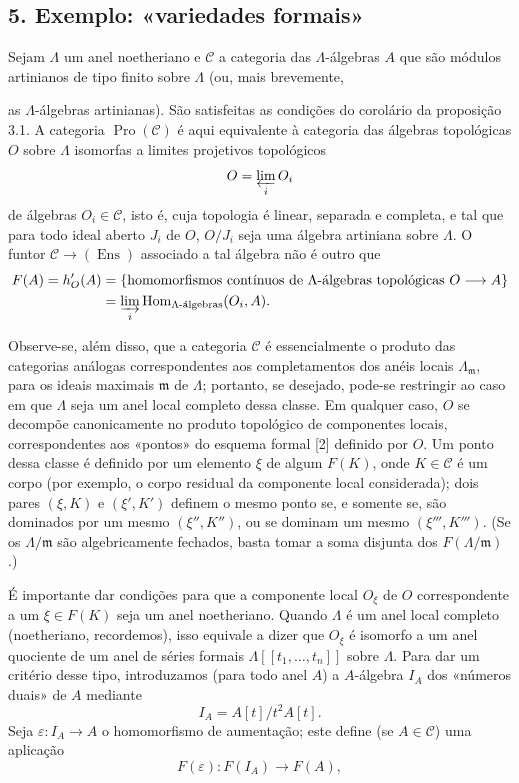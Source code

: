 \documentclass[11pt,twoside,openany]{book}
\numberwithin{equation}{section}
\newcommand{\src}[1]{%
  \phantomsection\hypertarget{src:#1}{}%
  \marginpar{\raggedleft\footnotesize\sffamily #1}%
}
\theoremstyle{plain}
\theoremstyle{definition}
\theoremstyle{remark}
\newcommand{\FgaUnitKey}{frontmatter}
\renewcommand{\src}[1]{%
  \phantomsection\hypertarget{src:\FgaUnitKey:#1}{}%
  \marginpar{\raggedleft\footnotesize\sffamily #1}%
}
\begin{document}
\subsection*{5. Exemplo: «variedades formais»}

Sejam $\Lambda$ um anel noetheriano e $\mathcal C$ a categoria das
$\Lambda$-álgebras $A$ que são módulos artinianos de tipo finito sobre
$\Lambda$ (ou, mais brevemente,

\src{375}
as $\Lambda$-álgebras artinianas). São satisfeitas as condições do corolário da
proposição 3.1. A categoria $\operatorname{Pro}(\mathcal C)$ é aqui
equivalente à categoria das álgebras topológicas $O$ sobre $\Lambda$
isomorfas a limites projetivos topológicos
\[
  O=\varprojlim_i O_i
\]
de álgebras $O_i\in\mathcal C$, isto é, cuja topologia é linear, separada e
completa, e tal que para todo ideal aberto $J_i$ de $O$, $O/J_i$ seja uma
álgebra artiniana sobre $\Lambda$. O funtor
$\mathcal C\longrightarrow(\operatorname{Ens})$ associado a tal álgebra não é
outro que
\begin{align*}
  F(A)=h'_O(A)
  &=\{\text{homomorfismos contínuos de $\Lambda$-álgebras topológicas }
       O\longrightarrow A\}\\
  &=\varinjlim_i
    \operatorname{Hom}_{\Lambda\text{-álgebras}}(O_i,A).
\end{align*}

Observe-se, além disso, que a categoria $\mathcal C$ é essencialmente o produto
das categorias análogas correspondentes aos completamentos dos
anéis locais $\Lambda_{\mathfrak m}$, para os ideais maximais
$\mathfrak m$ de $\Lambda$; portanto, se desejado, pode-se restringir ao caso
em que $\Lambda$ seja um anel local completo dessa classe. Em qualquer caso,
$O$ se decompõe canonicamente no produto topológico de componentes
locais, correspondentes aos «pontos» do esquema formal [2] definido por
$O$. Um ponto dessa classe é definido por um elemento $\xi$ de algum
$F(K)$, onde $K\in\mathcal C$ é um corpo (por exemplo, o corpo residual
da componente local considerada); dois pares $(\xi,K)$ e $(\xi',K')$
definem o mesmo ponto se, e somente se, são dominados por um mesmo
$(\xi'',K'')$, ou se dominam um mesmo $(\xi''',K''')$. (Se os
$\Lambda/\mathfrak m$ são algebricamente fechados, basta tomar a soma
disjunta dos $F(\Lambda/\mathfrak m)$.)

É importante dar condições para que a componente local $O_\xi$ de $O$
correspondente a um $\xi\in F(K)$ seja um anel noetheriano. Quando $\Lambda$
é um anel local completo (noetheriano, recordemos), isso equivale a dizer
que $O_\xi$ é isomorfo a um anel quociente de um anel de séries formais
$\Lambda[[t_1,\ldots,t_n]]$ sobre $\Lambda$. Para dar um critério desse tipo,
introduzamos (para todo anel $A$) a $A$-álgebra $I_A$ dos «números
duais» de $A$ mediante
\[
  I_A=A[t]/t^2A[t].
\]
Seja $\varepsilon:I_A\longrightarrow A$ o homomorfismo de aumentação; este define
(se $A\in\mathcal C$) uma aplicação
\[
  F(\varepsilon):F(I_A)\longrightarrow F(A),
\]
\end{document}
